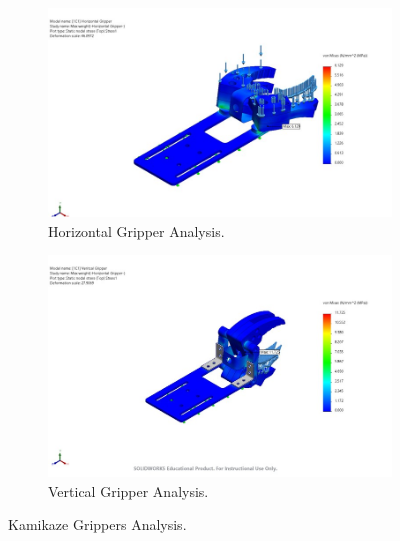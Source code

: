 \begin{figure}[h]
    \centering
    \begin{subfigure}[b]{0.49\columnwidth}
        \includegraphics[width=\textwidth]{Sections/2Design Rationale/images/Horizontal Max weight.jpg}
        \caption{Horizontal Gripper Analysis.}
        \label{fig:horizontal_gripper_max_weight}
    \end{subfigure}
    \hfill
    \begin{subfigure}[b]{0.49\columnwidth}
        \includegraphics[width=\textwidth]{Sections/2Design Rationale/images/Vertical max weight.jpg}
        \caption{Vertical Gripper Analysis.}
        \label{fig:vertical_gripper_max_weight}
    \end{subfigure}
    \caption{Kamikaze Grippers Analysis.}
    \label{fig:grippers_analysis}
\end{figure}